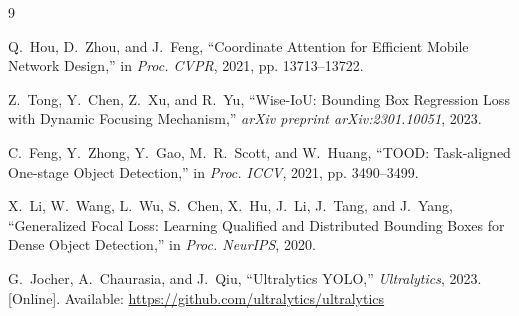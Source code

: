 \documentclass[11pt]{article}
\begin{document}
\begin{thebibliography}{9}

Q.~Hou, D.~Zhou, and J.~Feng,
``Coordinate Attention for Efficient Mobile Network Design,''
in \emph{Proc. CVPR}, 2021, pp. 13713--13722.

Z.~Tong, Y.~Chen, Z.~Xu, and R.~Yu,
``Wise-IoU: Bounding Box Regression Loss with Dynamic Focusing Mechanism,''
\emph{arXiv preprint arXiv:2301.10051}, 2023.

C.~Feng, Y.~Zhong, Y.~Gao, M.~R.~Scott, and W.~Huang,
``TOOD: Task-aligned One-stage Object Detection,''
in \emph{Proc. ICCV}, 2021, pp. 3490--3499.

X.~Li, W.~Wang, L.~Wu, S.~Chen, X.~Hu, J.~Li, J.~Tang, and J.~Yang,
``Generalized Focal Loss: Learning Qualified and Distributed Bounding Boxes for Dense Object Detection,''
in \emph{Proc. NeurIPS}, 2020.

G.~Jocher, A.~Chaurasia, and J.~Qiu,
``Ultralytics YOLO,''
\emph{Ultralytics}, 2023. [Online]. Available: \url{https://github.com/ultralytics/ultralytics}

\end{thebibliography}
\end{document}
